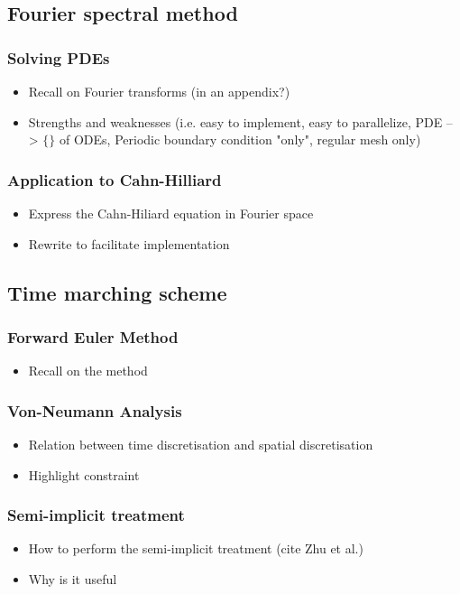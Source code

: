     \subsection{Fourier spectral method}
        \subsubsection{Solving PDEs}
        \begin{itemize}
            \item Recall on Fourier transforms (in an appendix?)
            \item Strengths and weaknesses (i.e. easy to implement, easy to parallelize, PDE --> $\{\}$ of ODEs, Periodic boundary condition "only", regular mesh only)
        \end{itemize}
        \subsubsection{Application to Cahn-Hilliard}
        \begin{itemize}
            \item Express the Cahn-Hiliard equation in Fourier space
            \item Rewrite to facilitate implementation
        \end{itemize}
    \subsection{Time marching scheme}
        \subsubsection{Forward Euler Method}
        \begin{itemize}
            \item Recall on the method
        \end{itemize}
        \subsubsection{Von-Neumann Analysis}
        \begin{itemize}
            \item Relation between time discretisation and spatial discretisation
            \item Highlight constraint
        \end{itemize}
        \subsubsection{Semi-implicit treatment}
        \begin{itemize}
            \item How to perform the semi-implicit treatment (cite Zhu et al.)
            \item Why is it useful
        \end{itemize}
